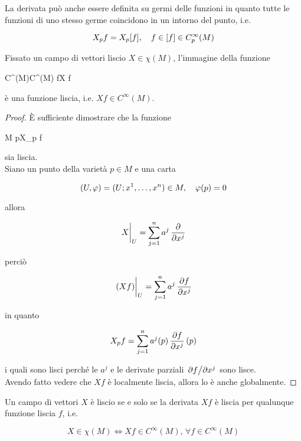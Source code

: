 La derivata può anche essere definita su germi delle funzioni in quanto tutte le funzioni di uno stesso germe coincidono in un intorno del punto, i.e.

\begin{equation}
	X_{p} f = X_{p} [f] \qcomma f \in [f] \in C_{p}^{\infty}(M)
\end{equation}

\begin{definition}
	Fissato un campo di vettori liscio $ X \in \chi(M) $, l'immagine della funzione
	
		{C^{\infty}(M)}{C^{\infty}(M)}
		{f}{X f}

	è una funzione liscia, i.e. $ X f \in C^{\infty}(M) $.
\end{definition}

\begin{proof}
	È sufficiente dimostrare che la funzione
	
		{M}{\R}
		{p}{X_{p} f}

	sia liscia. \\
	Siano un punto della varietà $ p \in M $ e una carta
	
	\begin{equation}
		(U,\varphi) = (U; x^{1},\dots,x^{n}) \in M \qcomma \varphi(p) = 0
	\end{equation}
	
	allora
	
	\begin{equation}
		\eval{X}_{U} = \sum_{j=1}^{n} a^{j} \, \pdv{x^{j}}
	\end{equation}

	perciò
	
	\begin{equation}
		\eval{(X f)}_{U} = \sum_{j=1}^{n} a^{j} \, \pdv{f}{x^{j}}
	\end{equation}

	in quanto
	
	\begin{equation}
		X_{p} f = \sum_{j=1}^{n} a^{j}(p) \, \pdv{f}{x^{j}} \, (p)
	\end{equation}

	i quali sono lisci perché le $ a^{j} $ e le derivate parziali $ \pdv*{f}{x^{j}} $ sono lisce. \\
	Avendo fatto vedere che $ X f $ è localmente liscia, allora lo è anche globalmente.
\end{proof}

\begin{definition}
	Un campo di vettori $ X $ è liscio se e solo se la derivata $ X f $ è liscia per qualunque funzione liscia $ f $, i.e.
	
	\begin{equation}
		X \in \chi(M) \iff X f \in C^{\infty}(M), \, \forall f \in C^{\infty}(M)
	\end{equation}
\end{definition}

